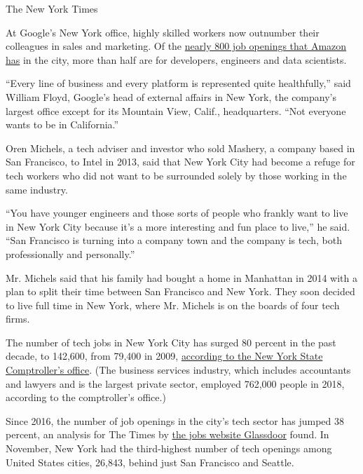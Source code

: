 The New York Times

At Google's New York office, highly skilled workers now outnumber their
colleagues in sales and marketing. Of the
\href{https://www.amazon.jobs/en/search?offset=0\&result_limit=10\&sort=relevant\&job_type=Full-Time\&cities\%5B\%5D=New\%20York\%2C\%20New\%20York\%2C\%20USA\&distanceType=Mi\&radius=24km\&latitude=40.71455\&longitude=-74.00714\&loc_group_id=\&loc_query=New\%20York\%2C\%20New\%20York\%2C\%20United\%20States\&base_query=\&city=New\%20York\&country=USA\&region=New\%20York\&county=New\%20York\&query_options=\&}{nearly
800 job openings that Amazon has} in the city, more than half are for
developers, engineers and data scientists.

``Every line of business and every platform is represented quite
healthfully,'' said William Floyd, Google's head of external affairs in
New York, the company's largest office except for its Mountain View,
Calif., headquarters. ``Not everyone wants to be in California.''

Oren Michels, a tech adviser and investor who sold Mashery, a company
based in San Francisco, to Intel in 2013, said that New York City had
become a refuge for tech workers who did not want to be surrounded
solely by those working in the same industry.

``You have younger engineers and those sorts of people who frankly want
to live in New York City because it's a more interesting and fun place
to live,'' he said. ``San Francisco is turning into a company town and
the company is tech, both professionally and personally.''

Mr. Michels said that his family had bought a home in Manhattan in 2014
with a plan to split their time between San Francisco and New York. They
soon decided to live full time in New York, where Mr. Michels is on the
boards of four tech firms.

The number of tech jobs in New York City has surged 80 percent in the
past decade, to 142,600, from 79,400 in 2009,
\href{https://www.osc.state.ny.us/osdc/rpt1-2020.pdf}{according to the
New York State Comptroller's office}. (The business services industry,
which includes accountants and lawyers and is the largest private
sector, employed 762,000 people in 2018, according to the comptroller's
office.)

Since 2016, the number of job openings in the city's tech sector has
jumped 38 percent, an analysis for The Times by
\href{http://www.glassdoor.com/}{the jobs website Glassdoor} found. In
November, New York had the third-highest number of tech openings among
United States cities, 26,843, behind just San Francisco and Seattle.

